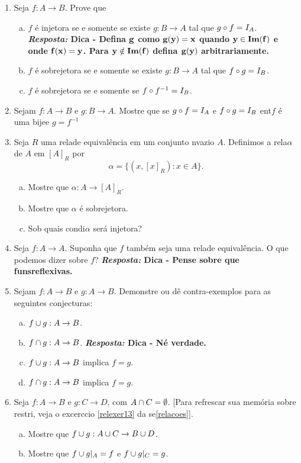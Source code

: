 \begin{enumerate}[{\bf 1.}]
\item Seja $f:A\to B$. Prove que
\begin{enumerate}[a)]
\item $f$ \'e injetora se e somente se existe $g:B\to A$ tal que $g\circ f=I_A$.
{\bf{\it Resposta:} Dica - Defina ${\bf g}$ como ${\bf g(y)=x}$ quando ${\bf y\in Im(f)}$ e onde ${\bf f(x)=y}$. Para ${\bf y\notin Im(f)}$ defina ${\bf g(y)}$ arbitrariamente.}

\item $f$ \'e sobrejetora se e somente se existe $g:B\to A$ tal que $f\circ g=I_B$.
\item $f$ \'e sobrejetora se e somente se $f\circ f^{-1}=I_B$.
\end{enumerate}

\item Sejam $f:A\to B$ e $g:B\to A$. Mostre que se $g\circ f=I_A$ e $f\circ g=I_B$ ent\ao $f$ \'e uma bije\cao e $g=f^{-1}$

\item Seja $R$ uma rela\cao de equival\^encia em um conjunto n\ao vazio $A$. Definimos a rela\cao $\alpha$ de $A$ em $[A]_R$ por
\[
\alpha=\{(x,[x]_R): x\in A\}.
\]
\begin{enumerate}[a)]
\item Mostre que $\alpha:A\to [A]_R$.
\item Mostre que $\alpha$ \'e sobrejetora.
\item Sob quais condi\coes $\alpha$ ser\'a injetora?
\end{enumerate}

\item Seja $f:A\to A$. Suponha que $f$ tamb\'em seja uma rela\cao de equival\^encia. O que podemos dizer sobre $f$? 
{\bf{\it Resposta:} Dica - Pense sobre que fun\coes s\ao reflexivas.}

\item Sejam $f:A\to B$ e $g:A\to B$. Demonstre ou d\^e contra-exemplos para as seguintes conjecturas:
\begin{enumerate}[a)]
\item $f\cup g:A\to B$.
\item $f\cap g:A\to B$. {\bf{\it Resposta:} Dica - N\ao \'e verdade.}
\item $f\cup g:A\to B$ implica $f=g$.
\item $f\cap g:A\to B$ implica $f=g$.
\end{enumerate}

\item Seja $f:A\to B$ e $g:C\to D$, com $A\cap C=\emptyset$. [Para refrescar sua mem\'oria sobre restri\cois, veja o excerc\ih cio \ref{relexer13} da se\cao \ref{relacoes}]. 
\begin{enumerate}[a)]
\item Mostre que $f\cup g:A\cup C\to B\cup D$.
\item Mostre que $f\cup g|_A=f$ e $f\cup g|_C=g$. 
\end{enumerate}


\end{enumerate}
